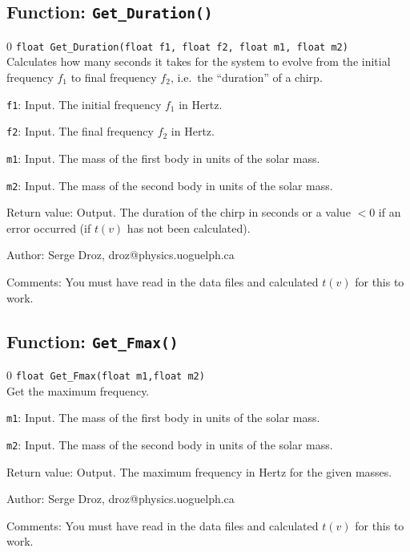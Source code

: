 \subsection{Function: {\tt Get\_Duration()}}
\setcounter{equation}0
{\tt float Get\_Duration(float f1, float f2, float m1, float m2)}\\
 Calculates how many seconds it takes for the system to evolve
 from the initial frequency $f_1$ to final frequency $f_2$, 
 i.e.~the ``duration'' of a chirp.
 
\begin{description}
\item{{\tt f1}}: Input. The initial frequency $f_1$ in Hertz.
\item{{\tt f2}}: Input. The final frequency $f_2$ in Hertz.
\item{{\tt m1}}: Input. The mass of the first body in units of the solar
mass.
\item{{\tt m2}}: Input. The mass of the second body in units of the solar
mass.
\item{Return value}: Output. The duration of the chirp in seconds or a value $<0$ if an error
 occurred (if $t(v)$ has not been calculated).
\end{description}
\begin{description}
\item{Author:} Serge Droz, droz@physics.uoguelph.ca
\item{Comments:} You must have read in the data files and calculated $t(v)$
for this to work.
\end{description} 
\clearpage
%
%

\subsection{Function: {\tt Get\_Fmax()}}
\setcounter{equation}0
{\tt float Get\_Fmax(float m1,float m2)}\\
Get the maximum frequency. 
\begin{description}
\item{{\tt m1}}: Input. The mass of the first body in units of the solar
mass.
\item{{\tt m2}}: Input. The mass of the second body in units of the solar
mass.
\item{Return value}: Output. The maximum frequency in Hertz for the 
given masses.
\end{description}
\begin{description}
\item{Author:} Serge Droz, droz@physics.uoguelph.ca
\item{Comments:} You must have read in the data files and calculated $t(v)$
for this to work.
\end{description} 
\clearpage
%
%

